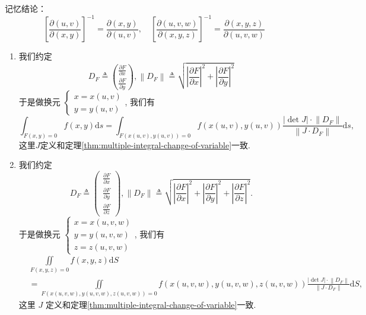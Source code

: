记忆结论：
\[
    \left[\frac{\partial(u, v)}{\partial(x, y)}\right]^{-1}=\frac{\partial(x, y)}{\partial(u, v)},\quad \left[\frac{\partial(u, v, w)}{\partial(x, y, z)}\right]^{-1}=\frac{\partial(x, y, z)}{\partial(u, v, w)}
\]
\begin{theorem}[第一类曲线曲面积分换元法]
    \begin{enumerate}
        \item 我们约定
        $$
        D_F \triangleq\binom{\frac{\partial F}{\partial x}}{\frac{\partial F}{\partial y}},\left\|D_F\right\| \triangleq \sqrt{\left|\frac{\partial F}{\partial x}\right|^2+\left|\frac{\partial F}{\partial y}\right|^2 }
        $$
        于是做换元 $\left\{\begin{array}{l}x=x(u, v) \\ y=y(u, v)\end{array}\right.$, 我们有
        $$
        \int_{F(x, y)=0} f(x, y) \mathrm{d} s=\int_{F(x(u, v), y(u, v))=0} f(x(u, v), y(u, v)) \frac{|\operatorname{det} J| \cdot\left\|D_F\right\|}{\left\|J \cdot D_F\right\|} \mathrm{d} s,
        $$
        这里$J$定义和定理\ref{thm:multiple-integral-change-of-variable}一致.
        \item 我们约定
        $$
        D_F \triangleq\left(\begin{array}{l}
        \frac{\partial F}{\partial x} \\
        \frac{\partial F}{\partial y} \\
        \frac{\partial F}{\partial z}
        \end{array}\right),\left\|D_F\right\| \triangleq \sqrt{\left|\frac{\partial F}{\partial x}\right|^2+\left|\frac{\partial F}{\partial y}\right|^2+\left|\frac{\partial F}{\partial z}\right|^2} .
        $$
        于是做换元 $\left\{\begin{array}{l}x=x(u, v, w) \\ y=y(u, v, w) \\ z=z(u, v, w)\end{array}\right.$, 我们有
        {\small
        $$
        \begin{aligned}
        & \iint\limits_{F(x, y, z)=0} f(x, y, z) \mathrm{d} S \\
        & =\iint\limits_{F(x(u, v, w), y(u, v, w), z(u, v, w))=0} f(x(u, v, w), y(u, v, w), z(u, v, w)) \frac{|\operatorname{det} J| \cdot\left\|D_F\right\|}{\left\|J \cdot D_F\right\|} \mathrm{d} S,
        \end{aligned}
        $$
        }
        这里 $J$ 定义和定理\ref{thm:multiple-integral-change-of-variable}一致.
    \end{enumerate}
\end{theorem}

